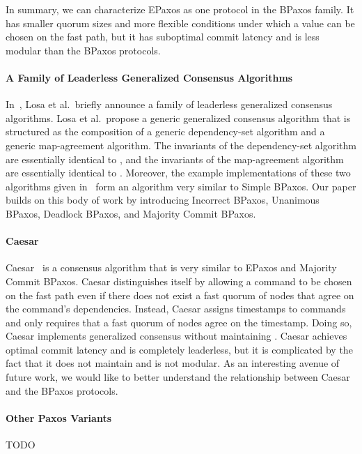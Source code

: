 In summary, we can characterize EPaxos as one protocol in the BPaxos family. It
has smaller quorum sizes and more flexible conditions under which a value can
be chosen on the fast path, but it has suboptimal commit latency and is less
modular than the BPaxos protocols.

\paragraph{A Family of Leaderless Generalized Consensus Algorithms}
In~\cite{losa2016brief}, Losa et al.\ briefly announce a family of leaderless
generalized consensus algorithms. Losa et al.\ propose a generic generalized
consensus algorithm that is structured as the composition of a generic
dependency-set algorithm and a generic map-agreement algorithm. The invariants
of the dependency-set algorithm are essentially identical to
, and the invariants of the map-agreement algorithm
are essentially identical to . Moreover, the example
implementations of these two algorithms given in~\cite{losa2016brief} form an
algorithm very similar to Simple BPaxos. Our paper builds on this body of work
by introducing Incorrect BPaxos, Unanimous BPaxos, Deadlock BPaxos, and
Majority Commit BPaxos.

\paragraph{Caesar}
Caesar~\cite{arun2017speeding} is a consensus algorithm that is very similar to
EPaxos and Majority Commit BPaxos. Caesar distinguishes itself by allowing a
command to be chosen on the fast path even if there does not exist a fast
quorum of nodes that agree on the command's dependencies. Instead, Caesar
assigns timestamps to commands and only requires that a fast quorum of nodes
agree on the timestamp. Doing so, Caesar implements generalized consensus
without maintaining . Caesar achieves optimal commit
latency and is completely leaderless, but it is complicated by the fact that it
does not maintain  and is not modular. As an
interesting avenue of future work, we would like to better understand the
relationship between Caesar and the BPaxos protocols.

\paragraph{Other Paxos Variants}
TODO
